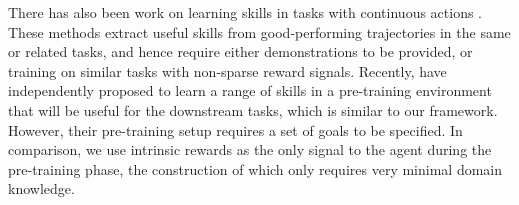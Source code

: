 \documentclass{article} %
\begin{document}
There has also been work on learning skills in tasks with continuous actions  \citep{schaal2005learning, konidaris2011autonomous, daniel2013autonomous, ranchod2015nonparametric}.
These methods extract useful skills from good-performing trajectories in the same or related tasks, and hence require either demonstrations to be provided, or training on similar tasks with non-sparse reward signals.
Recently, \cite{heess2016learning} have independently proposed to learn a range of skills in a pre-training environment that will be useful for the downstream tasks, which is similar to our framework.
However, their pre-training setup requires a set of goals to be specified.
In comparison, we use intrinsic rewards as the only signal to the agent during the pre-training phase, the construction of which only requires very minimal domain knowledge.%




\end{document}
